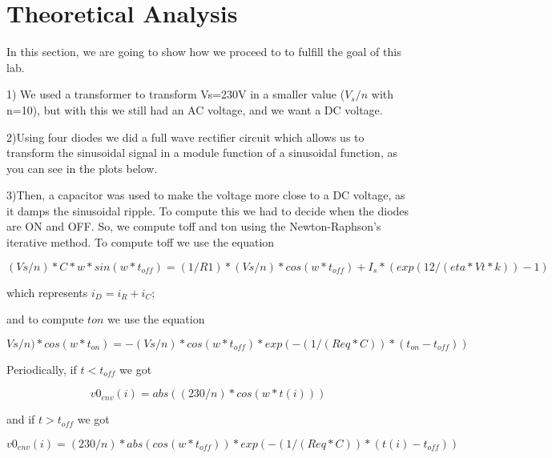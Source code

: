\section{Theoretical Analysis}
\label{Teorica}
In this section, we are going to show how we proceed to to fulfill the goal of this lab.

\par 1) We used a transformer to transform Vs=230V in a smaller value ($V_{s}/n$ with n=10), but with this we still had an AC voltage, and we want a DC voltage.
 \par
 2)Using four diodes we did a full wave rectifier circuit which allows us to transform the sinusoidal signal in a module function of a sinusoidal function, as you can see in the plots below.
 \par
 3)Then, a capacitor was used to make the voltage more close to a DC voltage, as it damps the sinusoidal ripple. To compute this we had to decide when the diodes are ON and OFF. So, we compute toff and ton using the Newton-Raphson's iterative method. To compute toff we use the equation 
 
 \begin{equation}
 (Vs/n)*C*w*sin(w*t_{off}) = (1/R1)*(Vs/n)*cos(w*t_{off}) + I_s*(exp(12/(eta*Vt*k))-1)
 \end{equation} 
 
 
 
 
 which represents $i_{D} = i_{R} + i_{C}$; 
 
 
 and to compute $ton$ we use the equation 
 
 \begin{equation}
 Vs/n)*cos(w*t_{on})=-(Vs/n)*cos(w*t_{off})*exp(-(1/(Req*C))*(t_{on}-t_{off})) 
 \end{equation}
 
 
 Periodically, if $t<t_{off}$ we got 
 
 \begin{equation}
 v0_{env}(i) = abs((230/n)*cos(w*t(i))) 
 \end{equation}
 
 and if $t>t_{off}$ we got  
 
 \begin{equation}
 v0_{env}(i) = (230/n)*abs(cos(w*t_{off}))*exp(-(1/(Req*C))*(t(i)-t_{off}))
 \end{equation}
 
